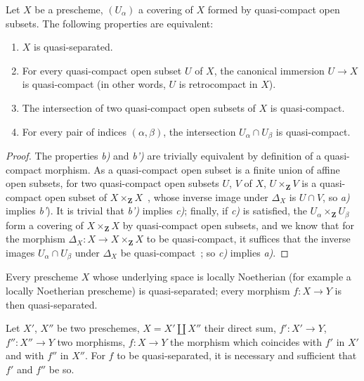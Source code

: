 \begin{proposition}[1.2.7]
\label{IV.1.2.7}
Let $X$ be a prescheme, $(U_\alpha)$ a covering of $X$ formed by quasi-compact open subsets. The following properties are equivalent:
\begin{enumerate}[label=\emph{\alph*)}]
  \item $X$ is quasi-separated.
  \item For every quasi-compact open subset $U$ of $X$, the canonical immersion $U\to X$ is quasi-compact
    (in other words, $U$ is retrocompact in $X$).
  \item[b')] The intersection of two quasi-compact open subsets of $X$ is quasi-compact.
  \item For every pair of indices $(\alpha,\beta)$, the intersection $U_\alpha\cap U_\beta$ is quasi-compact.
\end{enumerate}
\end{proposition}

\begin{proof}
The properties \emph{b)} and \emph{b')} are trivially equivalent by definition of a quasi-compact
morphism. As a quasi-compact open subset is a finite union of affine open subsets,
for two quasi-compact open subsets $U$, $V$ of $X$, $U\times_{\mathbf{Z}} V$ is a quasi-compact open subset
of $X\times_{\mathbf{Z}} X$~, whose inverse image under $\Delta_X$ is $U\cap V$, so \emph{a)} implies \emph{b'}).
It is trivial that \emph{b')} implies \emph{c)}; finally, if \emph{c)} is satisfied, the $U_\alpha\times_{\mathbf{Z}} U_\beta$ form a
covering of $X\times_{\mathbf{Z}} X$ by quasi-compact open subsets, and we know that for the
morphism $\Delta_X:X\to X\times_{\mathbf{Z}} X$ to be quasi-compact, it suffices that the inverse images
$U_\alpha\cap U_\beta$ under $\Delta_X$ be quasi-compact~; so \emph{c)} implies \emph{a)}.
\end{proof}

\begin{corollary}[1.2.8]
\label{IV.1.2.8}
Every prescheme $X$ whose underlying space is locally Noetherian
\textnormal{(}for example a locally Noetherian prescheme\textnormal{)} is quasi-separated; every morphism $f:X\to Y$ is
then quasi-separated.
\end{corollary}

\begin{proposition}[1.2.9]
\label{IV.1.2.9}
Let $X'$, $X''$ be two preschemes, $X=X'\coprod X''$ their direct sum,
$f':X'\to Y$, $f'':X''\to Y$ two morphisms, $f:X\to Y$ the morphism which coincides with $f'$ in $X'$
and with $f''$ in $X''$. For $f$ to be quasi-separated, it is necessary and sufficient that $f'$ and $f''$ be so.
\end{proposition}

